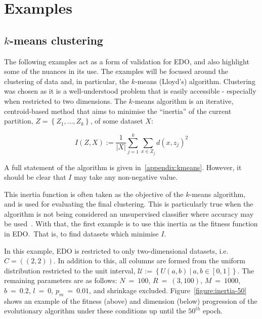 \section{Examples}\label{section:examples}

\subsection{\(k\)-means clustering}

The following examples act as a form of validation for EDO, and also highlight
some of the nuances in its use. The examples will be focused around the
clustering of data and, in particular, the \(k\)-means (Lloyd's) algorithm.
Clustering was chosen as it is a well-understood problem that is easily
accessible \-- especially when restricted to two dimensions. The \(k\)-means
algorithm is an iterative, centroid-based method that aims to minimise the
``inertia'' of the current partition, \(Z = \left\{Z_1, \ldots, Z_k\right\}\),
of some dataset \(X\):

\begin{equation}
    I(Z, X) := \frac{1}{|X|} \sum_{j=1}^{k} \sum_{x \in Z_j} {d(x, z_j)}^2
\end{equation}

A full statement of the algorithm is given in~\ref{appendix:kmeans}. However, it
should be clear that \(I\) may take any non-negative value.

This inertia function is often taken as the objective of the \(k\)-means
algorithm, and is used for evaluating the final clustering. This is particularly
true when the algorithm is not being considered an unsupervised classifier where
accuracy may be used~\cite{Huang1998}. With that, the first example is to use
this inertia as the fitness function in EDO.\ That is, to find datasets which
minimise \(I\).

In this example, EDO is restricted to only two-dimensional datasets, i.e.\ \(C =
\left((2, 2)\right)\). In addition to this, all columns are formed from the
uniform distribution restricted to the unit interval, \(\mathcal{U} :=
\left\{U(a, b)~|~a, b \in [0, 1]\right\}\). The remaining parameters are as
follows: \(N~=~100\), \(R~=~(3, 100)\), \(M~=~1000\), \(b~=~0.2\), \(l~=~0\),
\(p_m~=~0.01\), and shrinkage excluded. Figure~\ref{figure:inertia-50} shows an
example of the fitness (above) and dimension (below) progression of the
evolutionary algorithm under these conditions up until the \(50^{th}\) epoch.

%

